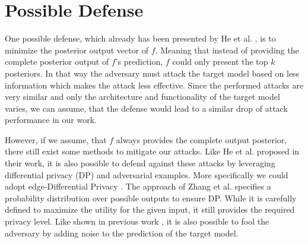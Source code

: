     \section{Possible Defense}
        One possible defense, which already has been presented by He et al. \cite{DBLP:journals/corr/abs-2005-02131}, is to minimize the posterior output vector of $f$. 
        Meaning that instead of providing the complete posterior output of $f$'s prediction, $f$ could only present the top $k$ posteriors.
        In that way the adversary must attack the target model based on less information which makes the attack less effective.
        Since the performed attacks are very similar and only the architecture and functionality of the target model varies, we can assume, that the defense would lead to a similar drop of attack performance in our work.
        
        However, if we assume, that $f$ always provides the complete output posterior, there still exist some methods to mitigate our attacks. 
        Like He et al. proposed in their work, it is also possible to defend against these attacks by leveraging differential privacy (DP) and adversarial examples.
        More specifically we could adopt edge-Differential Privacy \cite{Hay_accurateestimation, lu2020protect, 8345716, Zhang_2015}.
        The approach of Zhang et al. \cite{Zhang_2015} specifies a probability distribution over possible outputs to ensure DP.
        While it is carefully defined to maximize the utility for the given input, it still provides the required privacy level.
        Like shown in previous work \cite{jia2020attriguard, jia2019memguard}, it is also possible to fool the adversary by adding noise to the prediction of the target model.

